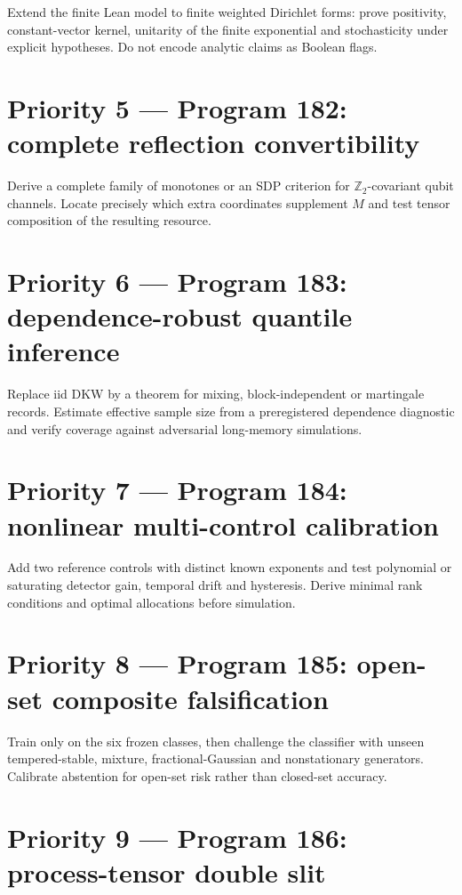 \documentclass[11pt,a4paper,openany]{report}
\begin{document}
Extend the finite Lean model to finite weighted Dirichlet forms: prove positivity, constant-vector kernel, unitarity of the finite exponential and stochasticity under explicit hypotheses. Do not encode analytic claims as Boolean flags.

\section{Priority 5 --- Program 182: complete reflection convertibility}

Derive a complete family of monotones or an SDP criterion for \(\mathbb Z_2\)-covariant qubit channels. Locate precisely which extra coordinates supplement \(M\) and test tensor composition of the resulting resource.

\section{Priority 6 --- Program 183: dependence-robust quantile inference}

Replace iid DKW by a theorem for mixing, block-independent or martingale records. Estimate effective sample size from a preregistered dependence diagnostic and verify coverage against adversarial long-memory simulations.

\section{Priority 7 --- Program 184: nonlinear multi-control calibration}

Add two reference controls with distinct known exponents and test polynomial or saturating detector gain, temporal drift and hysteresis. Derive minimal rank conditions and optimal allocations before simulation.

\section{Priority 8 --- Program 185: open-set composite falsification}

Train only on the six frozen classes, then challenge the classifier with unseen tempered-stable, mixture, fractional-Gaussian and nonstationary generators. Calibrate abstention for open-set risk rather than closed-set accuracy.

\section{Priority 9 --- Program 186: process-tensor double slit}
\end{document}

